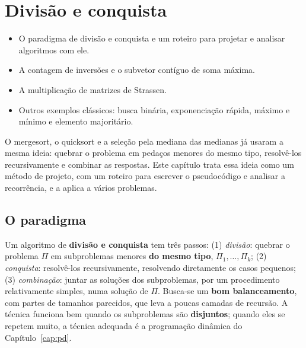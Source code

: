 \chapter{Divisão e conquista}\label{cap:dc}\label{sec:dc}
\begin{objetivos}
\begin{itemize}
  \item O paradigma de divisão e conquista e um roteiro para projetar e analisar algoritmos com ele.
  \item A contagem de inversões e o subvetor contíguo de soma máxima.
  \item A multiplicação de matrizes de Strassen.
  \item Outros exemplos clássicos: busca binária, exponenciação rápida, máximo e mínimo e elemento majoritário.
\end{itemize}
\end{objetivos}

O mergesort, o quicksort e a seleção pela mediana das medianas já usaram a mesma ideia: quebrar o problema em pedaços menores do mesmo tipo, resolvê-los recursivamente e combinar as respostas. Este capítulo trata essa ideia como um método de projeto, com um roteiro para escrever o pseudocódigo e analisar a recorrência, e a aplica a vários problemas.

\section{O paradigma}\label{sec:dcparadigma}
Um algoritmo de \textbf{divisão e conquista} tem três passos: (1) \emph{divisão}: quebrar o problema $\Pi$ em subproblemas menores \textbf{do mesmo tipo}, $\Pi_1,\dots,\Pi_k$; (2) \emph{conquista}: resolvê-los recursivamente, resolvendo diretamente os casos pequenos; (3) \emph{combinação}: juntar as soluções dos subproblemas, por um procedimento relativamente simples, numa solução de $\Pi$. Busca-se um \textbf{bom balanceamento}, com partes de tamanhos parecidos, que leva a poucas camadas de recursão. A técnica funciona bem quando os subproblemas são \textbf{disjuntos}; quando eles se repetem muito, a técnica adequada é a programação dinâmica do Capítulo~\ref{cap:pd}.

